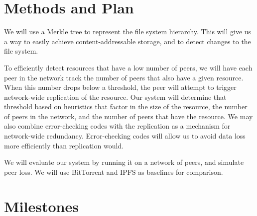 \documentclass{article}
\begin{document}
\section{Methods and Plan}


We will use a Merkle tree to represent the file system hierarchy.
This will give us a way to easily achieve content-addressable storage, and to detect changes to the file system.

To efficiently detect resources that have a low number of peers, we will have each peer in the network track the number of peers that also have a given resource.
When this number drops below a threshold, the peer will attempt to trigger network-wide replication of the resource.
Our system will determine that threshold based on heuristics that factor in the size of the resource, the number of peers in the network, and the number of peers that have the resource.
We may also combine error-checking codes with the replication as a mechanism for network-wide redundancy.
Error-checking codes will allow us to avoid data loss more efficiently than replication would.

We will evaluate our system by running it on a network of peers, and simulate peer loss.
We will use BitTorrent and IPFS as baselines for comparison.

\section{Milestones}


\lipsum[4]
\end{document}
